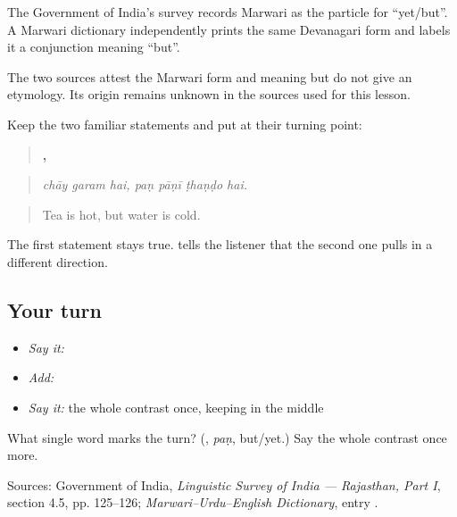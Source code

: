 The Government of India's survey records Marwari \textbf{} as the particle for “yet/but”. A Marwari dictionary independently prints the same Devanagari form and labels it a conjunction meaning “but”.

\begin{cousinweb}
The two sources attest the Marwari form and meaning but do not give an etymology. Its origin remains unknown in the sources used for this lesson.
\end{cousinweb}

\begin{grammarlens}[title={What you've built}]
Keep the two familiar statements and put \textbf{} at their turning point:

\begin{quote}
\textbf{  ,    }
\end{quote}

\begin{quote}
\emph{chāy garam hai, paṇ pāṇī ṭhaṇḍo hai.}
\end{quote}

\begin{quote}
Tea is hot, but water is cold.
\end{quote}

The first statement stays true. \textbf{} tells the listener that the second one pulls in a different direction.
\end{grammarlens}

\subsection*{Your turn}
\begin{itemize}
\raggedright
  \item \emph{Say it:} \textbf{  }
  \item \emph{Add:} \textbf{   }
  \item \emph{Say it:} the whole contrast once, keeping \textbf{} in the middle
\end{itemize}

\begin{tcolorbox}[breakable,colback=teal!4,colframe=teal!35!black,title={Before you move on}]
What single word marks the turn? (\textbf{}, \emph{paṇ}, but/yet.) Say the whole contrast once more.

Sources: Government of India, \emph{Linguistic Survey of India — Rajasthan, Part I}, section 4.5, pp. 125–126; \emph{Marwari–Urdu–English Dictionary}, entry \textbf{}.
\end{tcolorbox}
